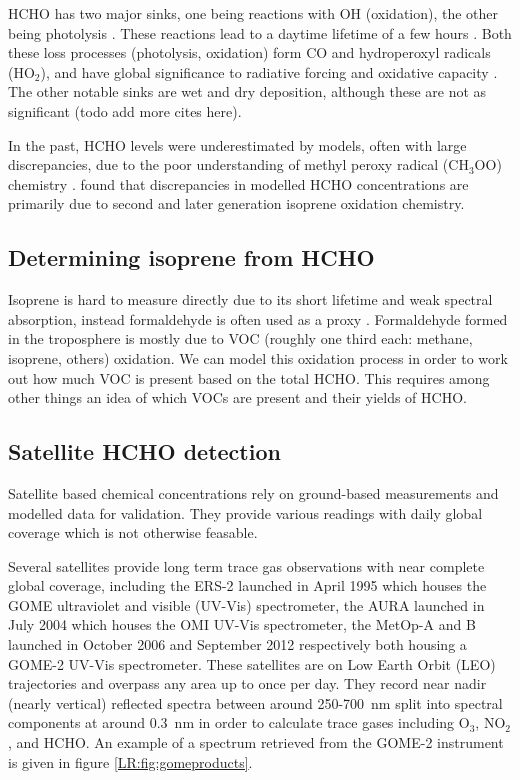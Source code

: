     HCHO has two major sinks, one being reactions with OH (oxidation), the other being photolysis \citep{Crutzen1999, Wagner2002, Levy1972, Kefauver2014}.
    These reactions lead to a daytime lifetime of a few hours \citep{Atkinson2000, Millet2006}.
    Both these loss processes (photolysis, oxidation) form CO and hydroperoxyl radicals (HO$_2$), and have global significance to radiative forcing and oxidative capacity \citep{Franco2015}.
    The other notable sinks are wet and dry deposition, although these are not as significant \citep{Atkinson2000} (todo add more cites here).
    
    In the past, HCHO levels were underestimated by models, often with large discrepancies, due to the poor understanding of methyl peroxy radical (CH$_3$OO) chemistry \citep{Wagner2002}.
    \cite{Marvin2017} found that discrepancies in modelled HCHO concentrations are primarily due to second and later generation isoprene oxidation chemistry.
    
  \subsection{Determining isoprene from HCHO}
    Isoprene is hard to measure directly due to its short lifetime and weak spectral absorption, instead formaldehyde is often used as a proxy \citep{Millet2006, Fu2007, Dufour2009, Marais2012, bauwens2013satellite, Kefauver2014, Bauwens2016}.
    Formaldehyde formed in the troposphere is mostly due to VOC (roughly one third each: methane, isoprene, others) oxidation.
    We can model this oxidation process in order to work out how much VOC is present based on the total HCHO.
    This requires among other things an idea of which VOCs are present and their yields of HCHO.
  
  \subsection{Satellite HCHO detection}
    Satellite based chemical concentrations rely on ground-based measurements and modelled data for validation.
    They provide various readings with daily global coverage which is not otherwise feasable.
    
    Several satellites provide long term trace gas observations with near complete global coverage, including the ERS-2 launched in April 1995 which houses the GOME ultraviolet and visible (UV-Vis) spectrometer, the AURA launched in July 2004 which houses the OMI UV-Vis spectrometer, the MetOp-A and B launched in October 2006 and September 2012 respectively both housing a GOME-2 UV-Vis spectrometer.
    These satellites are on Low Earth Orbit (LEO) trajectories and overpass any area up to once per day. 
    They record near nadir (nearly vertical) reflected spectra between around 250-700~nm split into spectral components at around $0.3$~nm in order to calculate trace gases including O$_3$, NO$_2$, and HCHO.
    An example of a spectrum retrieved from the GOME-2 instrument is given in figure \ref{LR:fig:gomeproducts}.
    
